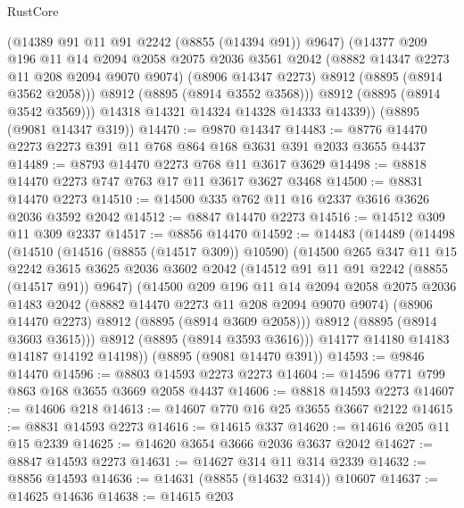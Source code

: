 \begin{lexlean}{RustCore}
\begin{coremodule}
            (@14389 @91 @11 @91 @2242 (@8855 (@14394 @91)) @9647)
            (@14377
              @209
              @196
              @11
              @14
              @2094
              @2058
              @2075
              @2036
              @3561
              @2042
              (@8882 @14347 @2273 @11 @208 @2094 @9070 @9074)
              (@8906 @14347 @2273)
              @8912
              (@8895 (@8914 @3562 @2058)))
            @8912
            (@8895 (@8914 @3552 @3568)))
          @8912
          (@8895 (@8914 @3542 @3569)))
        @14318
        @14321
        @14324
        @14328
        @14333
        @14339))
    (@8895 (@9081 @14347 @319))
@14470 := @9870 @14347
@14483 := @8776 @14470 @2273 @2273 @391 @11 @768 @864 @168 @3631 @391 @2033 @3655 @4437
@14489 := @8793 @14470 @2273 @768 @11 @3617 @3629
@14498 := @8818 @14470 @2273 @747 @763 @17 @11 @3617 @3627 @3468
@14500 := @8831 @14470 @2273
@14510 := @14500 @335 @762 @11 @16 @2337 @3616 @3626 @2036 @3592 @2042
@14512 := @8847 @14470 @2273
@14516 := @14512 @309 @11 @309 @2337
@14517 := @8856 @14470
@14592 := @14483
    (@14489
      (@14498
        (@14510
          (@14516 (@8855 (@14517 @309)) @10590)
          (@14500
            @265
            @347
            @11
            @15
            @2242
            @3615
            @3625
            @2036
            @3602
            @2042
            (@14512 @91 @11 @91 @2242 (@8855 (@14517 @91)) @9647)
            (@14500
              @209
              @196
              @11
              @14
              @2094
              @2058
              @2075
              @2036
              @1483
              @2042
              (@8882 @14470 @2273 @11 @208 @2094 @9070 @9074)
              (@8906 @14470 @2273)
              @8912
              (@8895 (@8914 @3609 @2058)))
            @8912
            (@8895 (@8914 @3603 @3615)))
          @8912
          (@8895 (@8914 @3593 @3616)))
        @14177
        @14180
        @14183
        @14187
        @14192
        @14198))
    (@8895 (@9081 @14470 @391))
@14593 := @9846 @14470
@14596 := @8803 @14593 @2273 @2273
@14604 := @14596 @771 @799 @863 @168 @3655 @3669 @2058 @4437
@14606 := @8818 @14593 @2273
@14607 := @14606 @218
@14613 := @14607 @770 @16 @25 @3655 @3667 @2122
@14615 := @8831 @14593 @2273
@14616 := @14615 @337
@14620 := @14616 @205 @11 @15 @2339
@14625 := @14620 @3654 @3666 @2036 @3637 @2042
@14627 := @8847 @14593 @2273
@14631 := @14627 @314 @11 @314 @2339
@14632 := @8856 @14593
@14636 := @14631 (@8855 (@14632 @314)) @10607
@14637 := @14625 @14636
@14638 := @14615 @203

\end{coremodule}
\end{lexlean}

